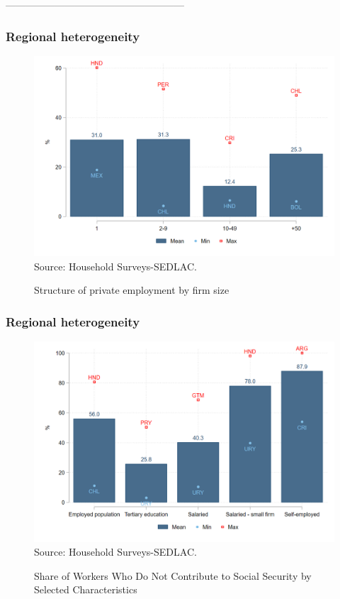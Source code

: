 \documentclass{beamer}
\begin{document}

------------------------------------------------------
 
\begin{frame}
\frametitle{Regional heterogeneity}
\begin{figure}[!htb]
        \justifying
        \caption{Structure of private employment by firm size}     
        \includegraphics[width=0.8\linewidth]{latex/figures/Snapshot/Structure of employment by firm size.png}
        \label{fig:firmsize}
        \centering
        \footnotesize{Source: Household Surveys-SEDLAC.}
        \end{figure}

\end{frame}
\begin{frame}
\frametitle{Regional heterogeneity}
\begin{figure}[!htb]
        \justifying
        \caption{Share of Workers Who Do Not Contribute to Social Security by Selected Characteristics}     
        \includegraphics[width=0.8\linewidth]{latex/figures/Snapshot/Social security contributions.png}
        \label{fig:SScontributions}
        \centering
        \footnotesize{Source: Household Surveys-SEDLAC.}
 \end{figure}
 \end{frame}
\end{document}
